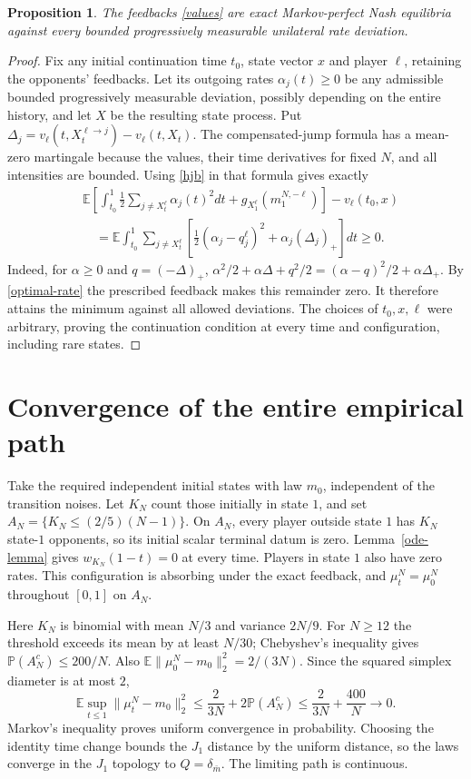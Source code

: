 \documentclass[11pt,a4paper]{article}
\newtheorem{proposition}{Proposition}
\newcommand{\E}{\mathbb E}
\newcommand{\Prb}{\mathbb P}
\begin{document}
\begin{proposition}\label{mpe}
The feedbacks \eqref{values} are exact Markov-perfect Nash equilibria
against every bounded progressively measurable unilateral rate deviation.
\end{proposition}
\begin{proof}
Fix any initial continuation time $t_0$, state vector $x$ and player
$\ell$, retaining the opponents' feedbacks. Let its outgoing rates
$\alpha_j(t)\ge0$ be any admissible bounded progressively measurable
deviation, possibly depending on the entire history, and let $X$ be
the resulting state process. Put
$\Delta_j=v_\ell(t,X_t^{\ell\to j})-v_\ell(t,X_t)$.
The compensated-jump formula has a mean-zero martingale because the
values, their time derivatives for fixed $N$, and all intensities
are bounded. Using \eqref{hjb} in that formula gives exactly
\begin{align}\label{verify}
 &\E\left[\int_{t_0}^1\tfrac12\sum_{j\ne X_t^\ell}\alpha_j(t)^2dt
 +g_{X_1^\ell}(m_1^{N,-\ell})\right]-v_\ell(t_0,x)\nonumber\\
 &\quad=\E\int_{t_0}^1\sum_{j\ne X_t^\ell}
 \left[\tfrac12(\alpha_j-q_j^\ell)^2+\alpha_j(\Delta_j)_+\right]dt\ge0.
\end{align}
Indeed, for $\alpha\ge0$ and $q=(-\Delta)_+$,
$\alpha^2/2+\alpha\Delta+q^2/2
=(\alpha-q)^2/2+\alpha\Delta_+$.
By \eqref{optimal-rate} the prescribed feedback makes this remainder
zero. It therefore attains the minimum against all allowed deviations.
The choices of $t_0,x,\ell$ were arbitrary, proving the continuation
condition at every time and configuration, including rare states.
\end{proof}

\section{Convergence of the entire empirical path}
Take the required independent initial states with law $m_0$, independent
of the transition noises. Let $K_N$ count those initially in state $1$,
and set $A_N=\{K_N\le(2/5)(N-1)\}$. On $A_N$, every player outside
state $1$ has $K_N$ state-$1$ opponents, so its initial scalar terminal
datum is zero. Lemma~\ref{ode-lemma} gives
$w_{K_N}(1-t)=0$ at every time. Players in state $1$ also have zero
rates. This configuration is absorbing under the exact feedback,
and $\mu_t^N=\mu_0^N$ throughout $[0,1]$ on $A_N$.

Here $K_N$ is binomial with mean $N/3$ and variance $2N/9$.
For $N\ge12$ the threshold exceeds its mean by at least $N/30$;
Chebyshev's inequality gives $\Prb(A_N^c)\le200/N$. Also
$\E\|\mu_0^N-m_0\|_2^2=2/(3N)$.
Since the squared simplex diameter is at most $2$,
\begin{equation}\label{convergence}
 \E\sup_{t\le1}\|\mu_t^N-m_0\|_2^2
 \le\frac{2}{3N}+2\Prb(A_N^c)
 \le\frac{2}{3N}+\frac{400}{N}\longrightarrow0.
\end{equation}
Markov's inequality proves uniform convergence in probability.
Choosing the identity time change bounds the $J_1$ distance by the
uniform distance, so the laws converge in the $J_1$ topology
to $Q=\delta_{\bar m}$. The limiting path is continuous.
\end{document}
